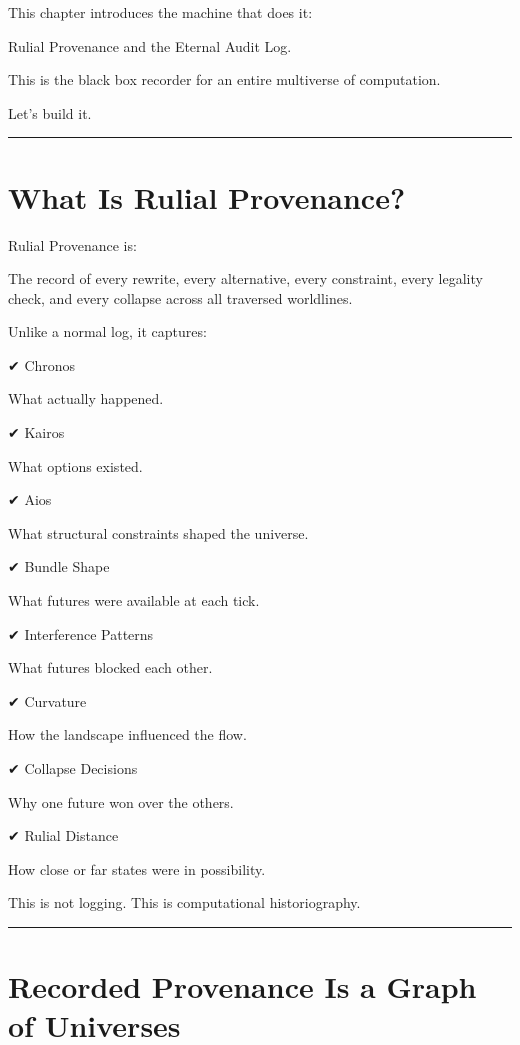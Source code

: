 This chapter introduces the machine that does it:

Rulial Provenance and the Eternal Audit Log.

This is the black box recorder for an entire multiverse of computation.

Let's build it.

\begin{center}\rule{0.5\linewidth}{0.5pt}\end{center}

\section{What Is Rulial
Provenance?}\label{what-is-rulial-provenance}

Rulial Provenance is:

The record of every rewrite, every alternative, every constraint, every
legality check, and every collapse across all traversed worldlines.

Unlike a normal log, it captures:

✔ Chronos

What actually happened.

✔ Kairos

What options existed.

✔ Aios

What structural constraints shaped the universe.

✔ Bundle Shape

What futures were available at each tick.

✔ Interference Patterns

What futures blocked each other.

✔ Curvature

How the landscape influenced the flow.

✔ Collapse Decisions

Why one future won over the others.

✔ Rulial Distance

How close or far states were in possibility.

This is not logging. This is computational historiography.

\begin{center}\rule{0.5\linewidth}{0.5pt}\end{center}

\section{Recorded Provenance Is a Graph of
Universes}\label{recorded-provenance-is-a-graph-of-universes}

